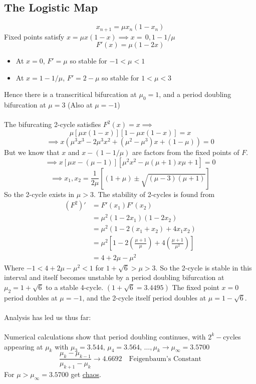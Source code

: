 \documentclass{article}
\begin{document}
\subsection{The Logistic Map}
 \[ \boxed{x_{n+1} = \mu x_n (1-x_n) } \]
Fixed points satisfy $x = \mu x(1-x) \implies x= \, 0,1-1/\mu$
\[F'(x) = \mu(1-2x) \]
\begin{itemize}
\item At $x=0$, $F' = \mu$ so stable for $-1 < \mu < 1$
\item At $x=1-1/\mu$, $F' = 2-\mu$ so stable for $1 < \mu < 3$
\end{itemize}
Hence there is a transcritical bifurcation at $\mu_0=1$, and a period doubling
bifurcation at $\mu =3$ (Also at $\mu = -1$)
\\
\\
The bifurcating 2-cycle satisfies $F^2(x) =x \implies$
\[ \mu [ \mu x(1-x)] [1 - \mu x (1-x) ] = x \]
\[ \implies x(\mu^3 x^3 - 2 \mu^3 x^2 + (\mu^2 - \mu^3)x + (1-\mu)) =0 \]
But we know that $x$ and $x-(1-1/\mu)$ are factors from the fixed points of 
$F$.
\[ \implies x[\mu x - (\mu-1)][\mu^2x^2 - \mu(\mu+1)x \mu + 1] =0 \]
\[ \implies x_1,x_2 = \frac{1}{2\mu} [(1+\mu) \pm \sqrt{(\mu-3)(\mu+1)}] \]
So the 2-cycle exists in $\mu >3$. The stability of 2-cycles is found from
\begin{align*}
(F^2)' &= F'(x_1)F'(x_2) \\
&= \mu^2 (1-2x_1)(1-2x_2) \\
&= \mu^2 ( 1-2(x_1+x_2) + 4x_1 x_2 ) \\
&= \mu^2 \left[ 1-2\left( \frac{\mu+1}{\mu} \right) + 4 \left( \frac{\mu+1}{\mu^2}
 \right) \right] \\
&= 4 + 2 \mu - \mu^2 
\end{align*}
Where $-1 < 4 + 2 \mu - \mu^2 <1$ for $1 + \sqrt{6} > \mu >3$. So the 2-cycle is
stable in this interval and itself becomes unstable by a period doubling 
bifurcation at $\mu_2 = 1 + \sqrt{6}$ to a stable 4-cycle. $(1 + \sqrt{6} 
= 3.4495)$ The fixed point $x=0$ period doubles at $\mu = -1$, and the 2-cycle
itself period doubles at $\mu = 1- \sqrt{6}$.
\\
\\
Analysis has led us thus far:
\\
\\
Numerical calculations show that period doubling continues, with $2^k-$cycles
appearing at $\mu_k$ with $\mu_3 = 3.544, \, \mu_4 = 3.564, \, \dots , \mu_k \to 
\mu_{\infty} = 3.5700$
\[ \frac{\mu_k-\mu_{k-1}}{\mu_{k+1} - \mu_{k} } \to 4.6692 \quad 
\mbox{Feigenbaum's Constant} \]
For $\mu > \mu_{\infty} = 3.5700 $ get \underline{chaos}.
\end{document}
